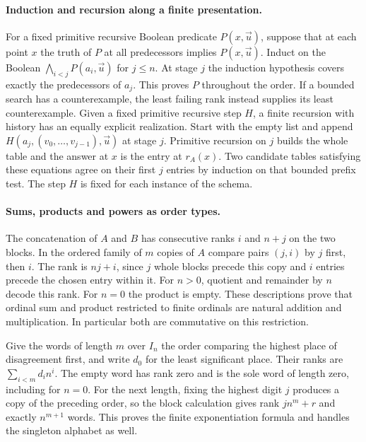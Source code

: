 \paragraph{Induction and recursion along a finite presentation.}
For a fixed primitive recursive Boolean predicate $P(x,\vec u)$, suppose
that at each point $x$ the truth of $P$ at all predecessors implies
$P(x,\vec u)$. Induct on the Boolean
$\bigwedge_{i<j}P(a_i,\vec u)$ for $j\le n$. At stage $j$ the
induction hypothesis covers exactly the predecessors of $a_j$.
This proves $P$ throughout the order. If a bounded search has a
counterexample, the least failing rank instead supplies its least
counterexample. Given a fixed primitive recursive step $H$, a finite
recursion with history has an equally explicit realization. Start with
the empty list and append
$H(a_j,(v_0,\ldots,v_{j-1}),\vec u)$ at stage $j$. Primitive
recursion on $j$ builds the whole table and the answer at $x$ is the
entry at $r_A(x)$. Two candidate tables satisfying these equations agree
on their first $j$ entries by induction on that bounded prefix test.
The step $H$ is fixed for each instance of the schema.

\paragraph{Sums, products and powers as order types.}
The concatenation of $A$ and $B$ has consecutive ranks $i$ and $n+j$
on the two blocks. In the ordered family of $m$ copies of $A$ compare
pairs $(j,i)$ by $j$ first, then $i$. The rank is $nj+i$, since $j$
whole blocks precede this copy and $i$ entries precede the chosen entry
within it. For $n>0$, quotient and remainder by $n$ decode this rank. For $n=0$ the product is empty. These descriptions prove that ordinal
sum and product restricted to finite ordinals are natural addition and
multiplication. In particular both are commutative on this restriction.

Give the words of length $m$ over $I_n$ the order comparing the highest
place of disagreement first, and write $d_0$ for the least significant
place. Their ranks are $\sum_{i<m}d_i n^i$. The empty word has rank
zero and is the sole word of length zero, including for $n=0$.
For the next length, fixing the highest digit $j$ produces a copy of
the preceding order, so the block calculation gives rank
$j n^m+r$ and exactly $n^{m+1}$ words. This proves the finite
exponentiation formula and handles the singleton alphabet as well.

